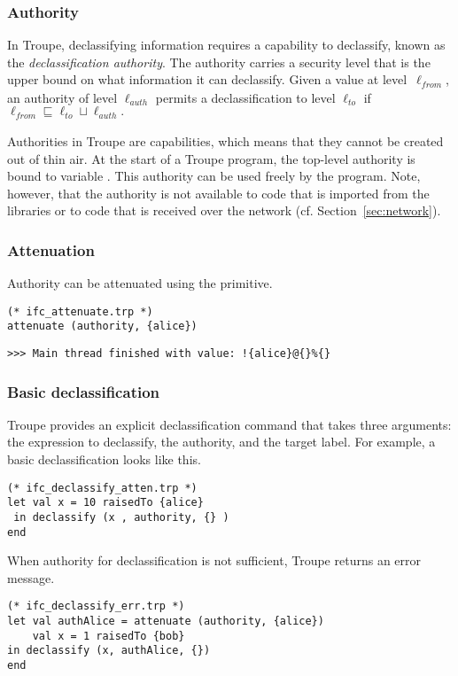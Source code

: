 \subsubsection{Authority}

In Troupe, declassifying information requires a capability to declassify,
known as the \emph{declassification authority}. 
The authority carries a security level that is the upper bound 
on what information it can declassify. 
%
Given  a value at 
level~$\ell_{\mathit{from}}$, an authority of 
level $\ell_{\mathit{auth}}$ permits a declassification to level 
$\ell_{\mathit{to}}$ if
${\ell_{\mathit{from}}} \sqsubseteq {  \ell_{\mathit{to}} \sqcup \ell_{\mathit{auth}}}.$

Authorities in Troupe are capabilities, which means that they cannot be 
created out of thin air. At the start of a Troupe program, the top-level authority is 
 bound to variable . This authority can be used freely by the program.
Note, however, that the authority is not available to code that is imported 
from the libraries or to code that is received over the network (cf. Section~\ref{sec:network}).


\subsubsection{Attenuation}
Authority can be attenuated using the  primitive. 

\begin{lstlisting}
(* ifc_attenuate.trp *)
attenuate (authority, {alice})    
\end{lstlisting}
\begin{verbatim}
>>> Main thread finished with value: !{alice}@{}%{}    
\end{verbatim}

\subsubsection{Basic declassification}
Troupe provides an explicit declassification command  that takes three arguments: 
the expression to declassify, the authority, and the target label. For example, a basic declassification
looks like this. 
\begin{lstlisting}
(* ifc_declassify_atten.trp *)
let val x = 10 raisedTo {alice}
 in declassify (x , authority, {} )
end 
\end{lstlisting}

When authority for declassification is not sufficient, Troupe returns an error message.
\begin{lstlisting}
(* ifc_declassify_err.trp *)
let val authAlice = attenuate (authority, {alice})
    val x = 1 raisedTo {bob}
in declassify (x, authAlice, {})
end     
\end{lstlisting}


